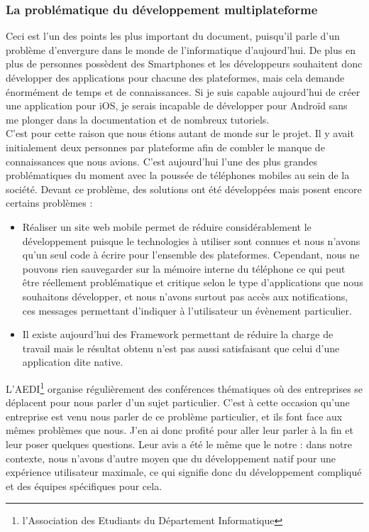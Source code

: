 \documentclass{article}
\begin{document}
\subsubsection{La problématique du développement multiplateforme}
		Ceci est l'un des points les plus important du document, puisqu'il parle d'un problème d'envergure dans le monde de l'informatique d'aujourd'hui. De plus en plus de personnes possèdent des Smartphones et les développeurs souhaitent donc développer des applications pour chacune des plateformes, mais cela demande énormément de temps et de connaissances. Si je suis capable aujourd'hui de créer une application pour iOS, je serais incapable de développer pour Androïd sans me plonger dans la documentation et de nombreux tutoriels. \\
		
		C'est pour cette raison que nous étions autant de monde sur le projet. Il y avait initialement deux personnes par plateforme afin de combler le manque de connaissances que nous avions.  C'est aujourd'hui l'une des plus grandes problématiques du moment avec la poussée de téléphones mobiles au sein de la société. Devant ce problème, des solutions ont été développées mais posent encore certains problèmes : 
		\begin{itemize}
			\item Réaliser un site web mobile permet de réduire considérablement le développement puisque le technologies à utiliser sont connues et nous n'avons qu'un seul code à écrire pour l'ensemble des plateformes. Cependant, nous ne pouvons rien sauvegarder sur la mémoire interne du téléphone ce qui peut être réellement problématique et critique selon le type d'applications que nous souhaitons développer, et nous n'avons surtout pas accès aux notifications, ces messages permettant d'indiquer à l'utilisateur un évènement particulier. 
			\item Il existe aujourd'hui des Framework permettant de réduire la charge de travail mais le résultat obtenu n'est pas aussi satisfaisant que celui d'une application dite native.\\
		\end{itemize}
		
		L'AEDI\footnote{l'Association des Etudiants du Département Informatique} organise régulièrement des conférences thématiques où des entreprises se déplacent pour nous parler d'un sujet particulier. C'est à cette occasion qu'une entreprise est venu nous parler de ce problème particulier, et ils font face aux mêmes problèmes que nous. J'en ai donc profité pour aller leur parler à la fin et leur poser quelques questions. Leur avis a été le même que le notre : dans notre contexte, nous n'avons d'autre moyen que du développement natif pour une expérience utilisateur maximale, ce qui signifie donc du développement compliqué et des équipes spécifiques pour cela.
		
\end{document}
